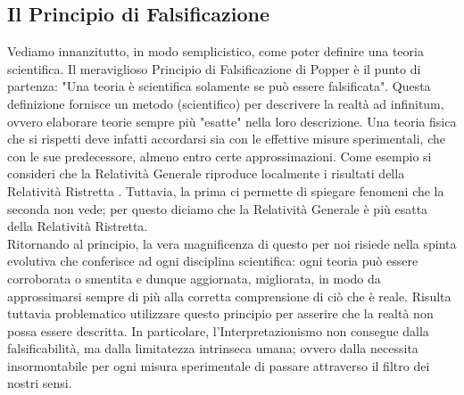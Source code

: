 \documentclass[]{article}
\begin{document}
		\subsection{Il Principio di Falsificazione}
	Vediamo innanzitutto, in modo semplicistico, come poter definire una teoria scientifica.
	Il meraviglioso Principio di Falsificazione di Popper è il punto di partenza: "Una teoria è scientifica solamente se può essere falsificata". Questa definizione fornisce un metodo (scientifico) per descrivere la realtà ad infinitum, ovvero elaborare teorie sempre più "esatte" nella loro descrizione. Una teoria fisica che si rispetti deve infatti accordarsi sia con le effettive misure sperimentali, che con le sue predecessore, almeno entro certe approssimazioni. Come esempio si consideri che la Relatività Generale riproduce localmente i risultati della Relatività Ristretta%
	. Tuttavia, la prima ci permette di spiegare fenomeni che la seconda non vede; per questo diciamo che la Relatività Generale è più esatta della Relatività Ristretta. \\
	Ritornando al principio, la vera magnificenza di questo per noi risiede nella spinta evolutiva che conferisce ad ogni disciplina scientifica: ogni teoria può essere corroborata o smentita e dunque aggiornata, migliorata, in modo da approssimarsi sempre di più alla corretta comprensione di ciò che è reale. 
	Risulta tuttavia problematico utilizzare questo principio per asserire che la realtà non possa essere descritta. In particolare, l'Interpretazionismo non consegue dalla falsificabilità, ma dalla limitatezza intrinseca umana; ovvero dalla necessita insormontabile per ogni misura sperimentale di passare attraverso il filtro dei nostri sensi.  
	
\end{document}

